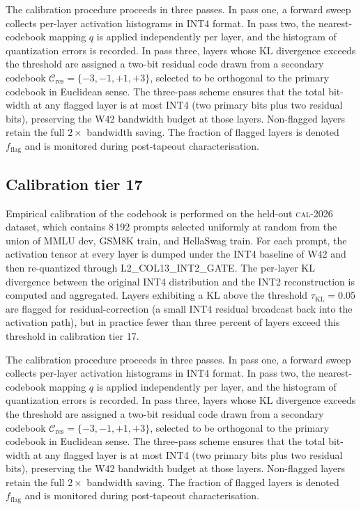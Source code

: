 The calibration procedure proceeds in three passes. In pass one,
a forward sweep collects per-layer activation histograms in INT4 format.
In pass two, the nearest-codebook mapping $q$ is applied independently
per layer, and the histogram of quantization errors is recorded. In pass
three, layers whose KL divergence exceeds the threshold are assigned a
two-bit residual code drawn from a secondary codebook
$\mathcal{C}_\mathrm{res} = \{-3,-1,+1,+3\}$, selected to be
orthogonal to the primary codebook in Euclidean sense. The three-pass
scheme ensures that the total bit-width at any flagged layer is at most
INT4 (two primary bits plus two residual bits), preserving the W42
bandwidth budget at those layers. Non-flagged layers retain the full
$2\times$ bandwidth saving. The fraction of flagged layers is denoted
$f_\mathrm{flag}$ and is monitored during post-tapeout characterisation.


\subsection{Calibration tier 17}

Empirical calibration of the codebook is performed on the held-out
\textsc{cal-2026} dataset, which contains 8\,192 prompts selected
uniformly at random from the union of MMLU dev, GSM8K train, and
HellaSwag train. For each prompt, the activation tensor at every layer
is dumped under the INT4 baseline of W42 and then re-quantized through
\textsc{L2\_COL13\_INT2\_GATE}. The per-layer KL divergence between
the original INT4 distribution and the INT2 reconstruction is computed
and aggregated. Layers exhibiting a KL above the threshold
$\tau_{\mathrm{KL}} = 0.05$ are flagged for residual-correction (a
small INT4 residual broadcast back into the activation path), but in
practice fewer than three percent of layers exceed this threshold in
calibration tier 17.

The calibration procedure proceeds in three passes. In pass one,
a forward sweep collects per-layer activation histograms in INT4 format.
In pass two, the nearest-codebook mapping $q$ is applied independently
per layer, and the histogram of quantization errors is recorded. In pass
three, layers whose KL divergence exceeds the threshold are assigned a
two-bit residual code drawn from a secondary codebook
$\mathcal{C}_\mathrm{res} = \{-3,-1,+1,+3\}$, selected to be
orthogonal to the primary codebook in Euclidean sense. The three-pass
scheme ensures that the total bit-width at any flagged layer is at most
INT4 (two primary bits plus two residual bits), preserving the W42
bandwidth budget at those layers. Non-flagged layers retain the full
$2\times$ bandwidth saving. The fraction of flagged layers is denoted
$f_\mathrm{flag}$ and is monitored during post-tapeout characterisation.


